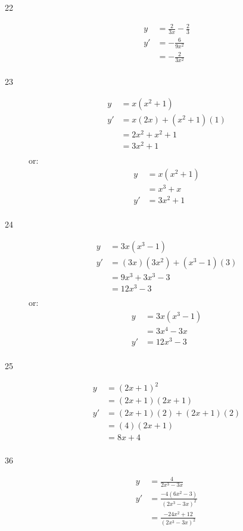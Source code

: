 \documentclass{exam}
\begin{document}
\begin{description}
\item[22]
\begin{align*}
  y  &= \frac{2}{3x} - \frac{2}{3} \\
  y' &= - \frac{6}{9x^2} \\
     &= - \frac{2}{3x^2} \\
\end{align*}

\item[23]
\begin{align*}
  y  &= x(x^2 + 1) \\
  y' &= x(2x) + (x^2 + 1)(1) \\
     &= 2x^2 + x^2 + 1 \\
     &= 3x^2 + 1 \\
\end{align*}
or:
\begin{align*}
  y  &= x(x^2 + 1) \\
     &= x^3 + x\\
  y' &= 3x^2 + 1 \\
\end{align*}

\item[24]
\begin{align*}
  y  &= 3x(x^3 - 1) \\
  y' &= (3x)(3x^2) + (x^3 - 1)(3) \\
     &= 9x^3 + 3x^3 - 3 \\
     &= 12x^3 - 3 \\
\end{align*}
or:
\begin{align*}
  y  &= 3x(x^3 - 1) \\
     &= 3x^4 - 3x \\
  y' &= 12x^3 - 3 \\
\end{align*}

\item[25]
\begin{align*}
  y &= (2x+1)^2 \\
    &= (2x+1)(2x + 1) \\
  y' &= (2x + 1)(2)  + (2x + 1)(2) \\
     &= (4) (2x + 1) \\
     &= 8x + 4 \\
\end{align*}

\item[36]
\begin{align*}
  y  &= \frac{4}{2x^3 - 3x} \\
  y' &= \frac{-4(6x^2 - 3)}{(2x^3 - 3x)^2} \\
     &= \frac{-24x^2 + 12}{(2x^3 - 3x)^2} \\
\end{align*}


\end{description}
\end{document}
